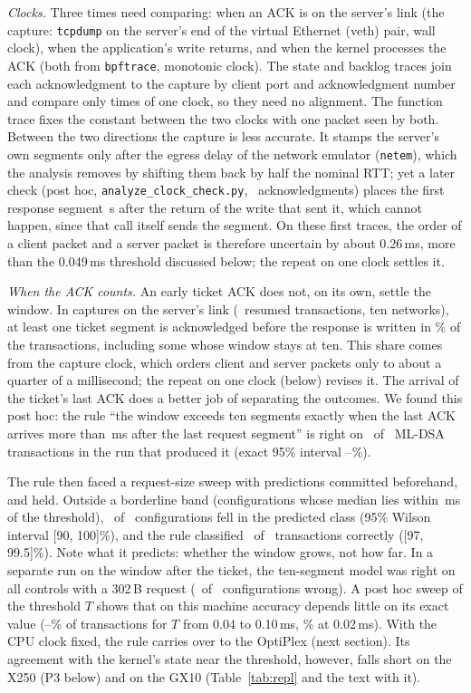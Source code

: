 \documentclass[9pt]{article}
\newcommand{\ms}{\,ms\xspace}
\begin{document}
\emph{Clocks.} Three times need comparing: when an ACK is on the server's link (the capture: \texttt{tcpdump} on the server's end of the virtual Ethernet (veth) pair, wall clock), when the application's write returns, and when the kernel processes the ACK (both from \texttt{bpftrace}, monotonic clock). The state and backlog traces join each acknowledgment to the capture by client port and acknowledgment number and compare only times of one clock, so they need no alignment. The function trace fixes the constant between the two clocks with one packet seen by both. Between the two directions the capture is less accurate. It stamps the server's own segments only after the egress delay of the network emulator (\texttt{netem}), which the analysis removes by shifting them back by half the nominal RTT; yet a later check (post hoc, \texttt{analyze\_clock\_check.py}, \ClkN\ acknowledgments) places the first response segment \ClkWriteAbs\,\textmu s after the return of the write that sent it, which cannot happen, since that call itself sends the segment. On these first traces, the order of a client packet and a server packet is therefore uncertain by about 0.26\ms, more than the 0.049\ms threshold discussed below; the repeat on one clock settles it.

\emph{When the ACK counts.} An early ticket ACK does not, on its own, settle the window. In captures on the server's link (\RaceN\ resumed transactions, ten networks), at least one ticket segment is acknowledged before the response is written in \RaceBeforePct\% of the transactions, including some whose window stays at ten. This share comes from the capture clock, which orders client and server packets only to about a quarter of a millisecond; the repeat on one clock (below) revises it. The arrival of the ticket's last ACK does a better job of separating the outcomes. We found this post hoc: the rule ``the window exceeds ten segments exactly when the last ACK arrives more than \RaceThr\ms after the last request segment'' is right on \RaceRight\ of \RaceMlN\ ML-DSA transactions in the run that produced it (exact 95\% interval \CiRaceLo--\CiRaceHi\%).

The rule then faced a request-size sweep with predictions committed beforehand, and held. Outside a borderline band (configurations whose median lies within \RaceBand\ms of the threshold), \RaceTwoRight\ of \RaceTwoScored\ configurations fell in the predicted class (95\% Wilson interval [90, 100]\%), and the rule classified \RaceTwoOosRight\ of \RaceTwoOosN\ transactions correctly ([97, 99.5]\%). Note what it predicts: whether the window grows, not how far. In a separate run on the window after the ticket, the ten-segment model was right on all controls with a 302\,B request (\ECtlWrong\ of \ECtlN\ configurations wrong). A post hoc sweep of the threshold $T$ shows that on this machine accuracy depends little on its exact value (\ThrSLoR--\ThrSHiR\% of transactions for $T$ from 0.04 to 0.10\ms, \ThrSA\% at 0.02\ms). With the CPU clock fixed, the rule carries over to the OptiPlex (next section). Its agreement with the kernel's state near the threshold, however, falls short on the X250 (P3 below) and on the GX10 (Table~\ref{tab:repl} and the text with it).
\end{document}
